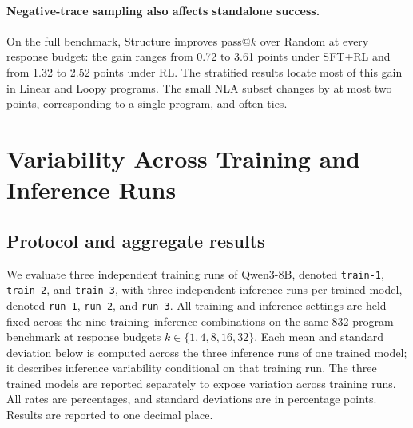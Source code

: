 \documentclass[10pt]{article}
\begin{document}
\paragraph{Negative-trace sampling also affects standalone success.}
On the full benchmark, Structure improves pass@\(k\) over Random at every
response budget: the gain ranges from 0.72 to 3.61 points under SFT+RL and
from 1.32 to 2.52 points under RL.  The stratified results locate most of
this gain in Linear and Loopy programs.  The small NLA subset changes by at
most two points, corresponding to a single program, and often ties.


\clearpage
\section{Variability Across Training and Inference Runs}
\label{app:supp-three-by-three}

\subsection{Protocol and aggregate results}

We evaluate three independent training runs of Qwen3-8B, denoted
\texttt{train-1}, \texttt{train-2}, and \texttt{train-3}, with three
independent inference runs per trained model, denoted
\texttt{run-1}, \texttt{run-2}, and \texttt{run-3}.
All training and inference settings are held fixed across the nine
training--inference combinations on the same 832-program benchmark at
response budgets \(k\in\{1,4,8,16,32\}\).
Each mean and standard deviation below is computed across the three
inference runs of one trained model; it describes inference variability
conditional on that training run.  The three trained models are reported
separately to expose variation across training runs.
All rates are percentages, and standard deviations are in percentage points.
Results are reported to one decimal place.
\end{document}

